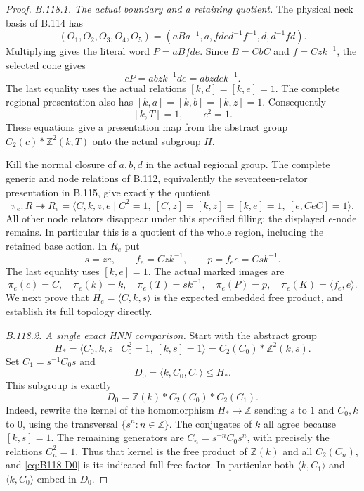 \begin{proof}
\emph{B.118.1. The actual boundary and a retaining quotient.}
The physical neck basis of B.114 has
\[
 (O_1,O_2,O_3,O_4,O_5)
 =(aBa^{-1},a,fde d^{-1}f^{-1},d,d^{-1}fd).
\]
Multiplying gives the literal word $P=aBfde$. Since $B=CbC$ and
$f=Czk^{-1}$, the selected cone gives
\[
 cP=abzk^{-1}de=abzde k^{-1}.
\]
The last equality uses the actual relations $[k,d]=[k,e]=1$.
The complete regional presentation also has
$[k,a]=[k,b]=[k,z]=1$. Consequently
\begin{equation}\label{eq:B118-boundary-commutes}
 [k,T]=1,\qquad c^2=1.
\end{equation}
These equations give a presentation map from the abstract group
$C_2(c)*\mathbb Z^2(k,T)$ onto the actual subgroup $H$.

Kill the normal closure of $a,b,d$ in the actual regional group.
The complete generic and node relations of B.112, equivalently the
seventeen-relator presentation in B.115, give exactly the quotient
\begin{equation}\label{eq:B118-retaining-quotient}
 \pi_e:R\twoheadrightarrow R_e
 =\langle C,k,z,e\mid C^2=1,\ [C,z]=[k,z]=[k,e]=1,
                                  \ [e,CeC]=1\rangle.
\end{equation}
All other node relators disappear under this specified filling;
the displayed $e$-node remains. In particular this is a quotient of
the whole region, including the retained base action. In $R_e$ put
\begin{equation}\label{eq:B118-quotient-marking}
 s=ze,\qquad f_e=Czk^{-1},\qquad p=f_e e=Csk^{-1}.
\end{equation}
The last equality uses $[k,e]=1$. The actual marked images are
\begin{equation}\label{eq:B118-actual-images}
 \pi_e(c)=C,\quad \pi_e(k)=k,\quad
 \pi_e(T)=sk^{-1},\quad \pi_e(P)=p,\quad
 \pi_e(K)=\langle f_e,e\rangle.
\end{equation}
We next prove that $H_e=\langle C,k,s\rangle$ is the expected
embedded free product, and establish its full topology directly.

\emph{B.118.2. A single exact HNN comparison.}
Start with the abstract group
\begin{equation}\label{eq:B118-abstract-base}
 H_* =\langle C_0,k,s\mid C_0^2=1,\ [k,s]=1\rangle
      =C_2(C_0)*\mathbb Z^2(k,s).
\end{equation}
Set $C_1=s^{-1}C_0s$ and
\[
 D_0=\langle k,C_0,C_1\rangle\leq H_*.
\]
This subgroup is exactly
\begin{equation}\label{eq:B118-D0}
 D_0=\mathbb Z(k)*C_2(C_0)*C_2(C_1).
\end{equation}
Indeed, rewrite the kernel of the homomorphism $H_*\to\mathbb Z$
sending $s$ to $1$ and $C_0,k$ to $0$, using the transversal
$\{s^n:n\in\mathbb Z\}$. The conjugates of $k$ all agree because
$[k,s]=1$. The remaining generators are
$C_n=s^{-n}C_0s^n$, with precisely the relations $C_n^2=1$.
Thus that kernel is the free product of $\mathbb Z(k)$ and all
$C_2(C_n)$, and \eqref{eq:B118-D0} is its indicated full free factor.
In particular both $\langle k,C_1\rangle$ and
$\langle k,C_0\rangle$ embed in $D_0$.


\end{proof}
